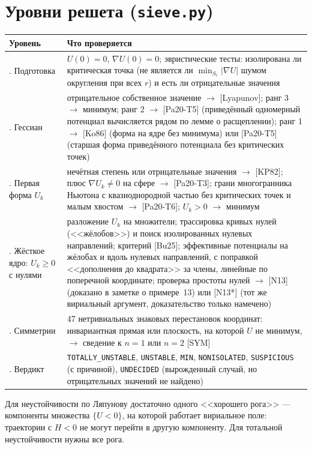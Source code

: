 \documentclass[11pt,a4paper]{article}
\begin{document}
\section{Уровни решета (\texttt{sieve.py})}
\begin{center}\small
\begin{tabularx}{\textwidth}{>{\raggedright\arraybackslash}p{3.1cm}X}
\toprule
Уровень & Что проверяется \\
\midrule
0. Подготовка & $U(0)=0$, $\nabla U(0)=0$; эвристические тесты: изолирована ли критическая точка (не
является ли $\min_{S_r}|\nabla U|$ шумом округления при всех $r$) и есть ли отрицательные значения\\
1. Гессиан & отрицательное собственное значение $\to$ [Lyapunov]; ранг 3 $\to$ минимум; ранг 2 $\to$ [Pa20-T5]
(приведённый одномерный потенциал вычисляется рядом по лемме о расщеплении); ранг 1 $\to$ [Ko86] (форма на
ядре без минимума) или [Pa20-T5] (старшая форма приведённого потенциала без критических точек)\\
2. Первая форма $U_k$ & нечётная степень или отрицательные значения $\to$ [KP82]; плюс $\nabla U_k\neq0$ на
сфере $\to$ [Pa20-T3]; грани многогранника Ньютона с квазиоднородной частью без критических точек и малым
хвостом $\to$ [Pa20-T6]; $U_k>0$ $\to$ минимум\\
3. Жёсткое ядро: $U_k\ge0$ с нулями & разложение $U_k$ на множители; трассировка кривых нулей
(<<жёлобов>>) и поиск изолированных нулевых направлений; критерий [Bu25]; эффективные потенциалы на
жёлобах и вдоль нулевых направлений, с поправкой <<дополнения до квадрата>> за члены, линейные по
поперечной координате; проверка простоты нулей $\to$ [N13] (доказано в заметке о примере~13) или
[N13*] (тот же вириальный аргумент, доказательство только намечено)\\
4. Симметрии & 47 нетривиальных знаковых перестановок координат: инвариантная прямая или плоскость, на
которой $U$ не минимум, $\to$ сведение к $n=1$ или $n=2$ [SYM]\\
5. Вердикт & \texttt{TOTALLY\_UNSTABLE}, \texttt{UNSTABLE}, \texttt{MIN}, \texttt{NONISOLATED},
\texttt{SUSPICIOUS} (с причиной), \texttt{UNDECIDED} (вырожденный случай, но отрицательных значений не
найдено)\\
\bottomrule
\end{tabularx}
\end{center}
Для неустойчивости по Ляпунову достаточно одного <<хорошего рога>> --- компоненты множества $\{U<0\}$, на
которой работает вириальное поле: траектории с $H<0$ не могут перейти в другую компоненту. Для тотальной
неустойчивости нужны все рога.
\end{document}
